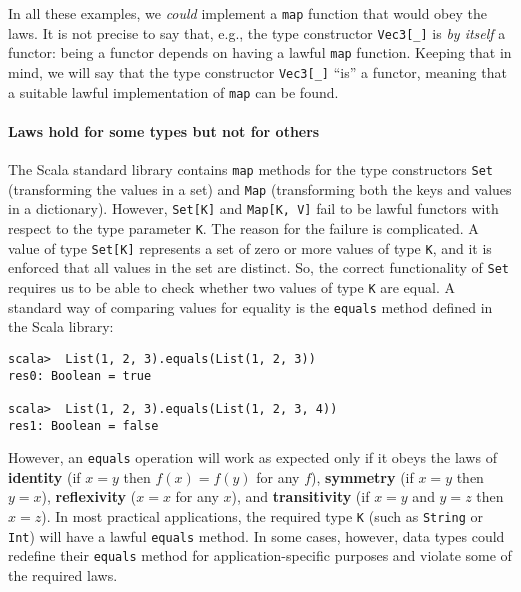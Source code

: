In all these examples, we \emph{could} implement a \lstinline!map!
function that would obey the laws. It is not precise to say that,
e.g., the type constructor \lstinline!Vec3[_]! is \emph{by itself}
a functor: being a functor depends on having a lawful \lstinline!map!
function. Keeping that in mind, we will say that the type constructor
\lstinline!Vec3[_]! \textsf{``}is\textsf{''} a functor, meaning that a suitable lawful
implementation of \lstinline!map! can be found.

\paragraph{Laws hold for some types but not for others}

The Scala standard library contains \lstinline!map! methods for the
type constructors \lstinline!Set! (transforming the values in a set)
and \lstinline!Map! (transforming both the keys and values in a dictionary).
However, \lstinline!Set[K]! and \lstinline!Map[K, V]! fail to be
lawful functors with respect to the type parameter \lstinline!K!.
The reason for the failure is complicated. A value of type \lstinline!Set[K]!
represents a set of zero or more values of type \lstinline!K!, and
it is enforced that all values in the set are distinct. So, the correct
functionality of \lstinline!Set! requires us to be able to\emph{
}check whether two values of type \lstinline!K! are equal. A standard
way of comparing values for equality is the \lstinline!equals! method
defined in the Scala library:
\begin{lstlisting}
scala>  List(1, 2, 3).equals(List(1, 2, 3))
res0: Boolean = true

scala>  List(1, 2, 3).equals(List(1, 2, 3, 4))
res1: Boolean = false
\end{lstlisting}
However, an \lstinline!equals! operation will work as expected only
if it obeys the \label{par:label-equality-laws}laws of \textbf{identity}
(if $x=y$ then $f(x)=f(y)$ for any $f$), \textbf{symmetry} (if
$x=y$ then $y=x$), \textbf{reflexivity}
($x=x$ for any $x$), and \textbf{transitivity}
(if $x=y$ and $y=z$ then $x=z$). In most practical applications,
the required type \lstinline!K! (such as \lstinline!String! or \lstinline!Int!)
will have a lawful \lstinline!equals! method. In some cases, however,
data types could redefine their \lstinline!equals! method for application-specific
purposes and violate some of the required laws.

